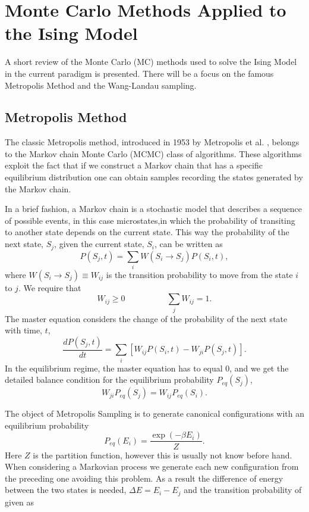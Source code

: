 \chapter{Monte Carlo Methods Applied to the Ising Model}

A short review of the Monte Carlo (MC) methods used to solve the Ising Model in the current paradigm is presented. There will be a focus on the famous Metropolis Method and the Wang-Landau sampling. 

\section{Metropolis Method}

The classic Metropolis method, introduced in 1953 by Metropolis et al. \cite{Metropolis1953}, belongs to the Markov chain Monte Carlo (MCMC) class of algorithms. These algorithms exploit the fact that if we construct a Markov chain that has a specific equilibrium distribution one can obtain samples recording the states generated by the Markov chain. 

In a brief fashion, a Markov chain is a stochastic model that describes a sequence of possible events, in this case microstates,in which the probability of transiting to another state depends on the current state. This way the probability of the next state, $S_j$, given the current state, $S_i$, can be written as 
\begin{equation}
	P(S_j, t) = \sum_i W(S_i \rightarrow S_j) P(S_i, t),
\end{equation}
where $W(S_i \rightarrow S_j) \equiv W_{ij}$ is the transition probability to move from the state $i$ to $j$. We require that 
\begin{equation}
	W_{ij}  \geq 0 \quad \quad \quad \quad \quad \sum_j W_{ij}=1.
\end{equation}
The master equation considers the change of the probability of the next state with time, $t$,
\begin{equation}
	\frac{dP(S_j, t)}{dt} = \sum_i \left[ W_{ij}P(S_i, t) - W_{ji} P(S_j,t)  \right].
\end{equation}
In the equilibrium regime, the master equation has to equal $0$, and we get the detailed balance condition for the equilibrium probability $P_{eq}(S_j)$,
\begin{equation}
	W_{ji}P_{eq}(S_j) = W_{ij}P_{eq}(S_i).
\end{equation}

The object of Metropolis Sampling is to generate canonical configurations with an equilibrium probability
\begin{equation} \label{eq:met_prob_eq}
	P_{eq}(E_i) = \frac{\exp(-\beta E_i)}{Z}.
\end{equation}
Here $Z$ is the partition function, however this is usually not know before hand. When considering a Markovian process we generate each new configuration from the preceding one avoiding this problem. As a result the difference of energy between the two states is needed, $\Delta E = E_i - E_j$ and the transition probability of given as

